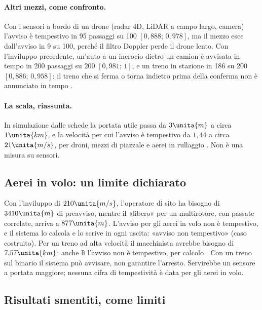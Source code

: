 \paragraph{Altri mezzi, come confronto.} Con i sensori a bordo di un drone (radar 4D, LiDAR a campo largo, camera) l'avviso è tempestivo in 95 passaggi su 100 $[0{,}888;\,0{,}978]$, ma il mezzo esce dall'avviso in 9 su 100, perché il filtro Doppler perde il drone lento. Con l'inviluppo precedente, un'auto a un incrocio dietro un camion è avvisata in tempo in 200 passaggi su 200 $[0{,}981;\,1]$, e un treno in stazione in 186 su 200 $[0{,}886;\,0{,}958]$: il treno che si ferma o torna indietro prima della conferma non è annunciato in tempo .

\paragraph{La scala, riassunta.} In simulazione dalle schede la portata utile passa da $3\unita{m}$ a circa $1\unita{km}$, e la velocità per cui l'avviso è tempestivo da $1{,}44$ a circa $21\unita{m/s}$, per droni, mezzi di piazzale e aerei in rullaggio . Non è una misura su sensori.

\subsection{Aerei in volo: un limite dichiarato}\label{sec:lp-volo}

Con l'inviluppo di $210\unita{m/s}$, l'operatore di sito ha bisogno di $3410\unita{m}$ di preavviso, mentre il «libero» per un multirotore, con passate correlate, arriva a $877\unita{m}$. L'avviso per gli aerei in volo non è tempestivo, e il sistema lo calcola e lo scrive in ogni uscita: «avviso non tempestivo»  (caso costruito). Per un treno ad alta velocità il macchinista avrebbe bisogno di $7{,}57\unita{km}$: anche lì l'avviso non è tempestivo, per calcolo . Con un treno sul binario il sistema può avvisare, non garantire l'arresto. Servirebbe un sensore a portata maggiore; nessuna cifra di tempestività è data per gli aerei in volo.

\subsection{Risultati smentiti, come limiti}\label{sec:lp-smentiti}

